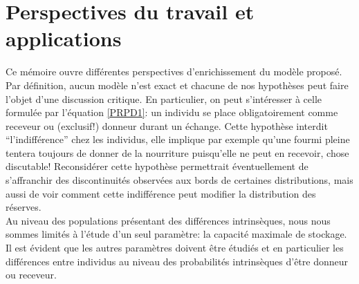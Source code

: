 %


\section{Perspectives du travail et applications}

Ce mémoire ouvre différentes perspectives d'enrichissement du modèle proposé. Par définition, aucun modèle n'est exact et chacune de nos hypothèses peut faire l'objet d'une discussion critique. En particulier, on peut s'intéresser à celle formulée par l'équation \ref{PRPD1}: un individu se place obligatoirement comme receveur ou (exclusif!) donneur durant un échange. Cette hypothèse interdit ``l'indifférence'' chez les individus, elle implique par exemple qu'une fourmi pleine tentera toujours de donner de la nourriture puisqu'elle ne peut en recevoir, chose discutable! Reconsidérer cette hypothèse permettrait éventuellement de s'affranchir des discontinuités observées aux bords de certaines distributions, mais aussi de voir comment cette indifférence peut modifier la distribution des réserves.\\

Au niveau des populations présentant des différences intrinsèques, nous nous sommes limités à l'étude d'un seul paramètre: la capacité maximale de stockage. Il est évident que les autres paramètres doivent être étudiés et en particulier les différences entre individus au niveau des probabilités intrinsèques d'être donneur ou receveur.\\

